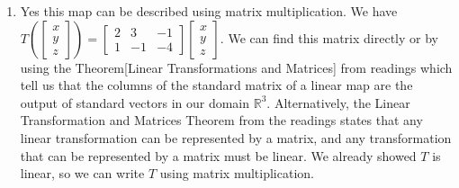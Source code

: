 \begin{SaveQuestion}
\begin{enumerate}
        \item Yes this map can be described using matrix multiplication. We have $T\left(\begin{bmatrix}x\\y \\z \end{bmatrix}\right) = \begin{bmatrix} 2 &  3 &  - 1 \\ 1 & -1 & -4\end{bmatrix}\begin{bmatrix}x\\y \\z \end{bmatrix}$. We can find this matrix directly or by using the Theorem[Linear Transformations and Matrices] from readings which tell us that the columns of the standard matrix of a linear map are the output of standard vectors in our domain $\mathbb R^3$. 
        Alternatively, the Linear Transformation and Matrices Theorem from the readings states that any linear transformation can be represented by a matrix, and any transformation that can be represented by a matrix must be linear. We already showed $T$ is linear, so we can write $T$ using matrix multiplication. 

        
         
  \end{enumerate}
\end{SaveQuestion}


